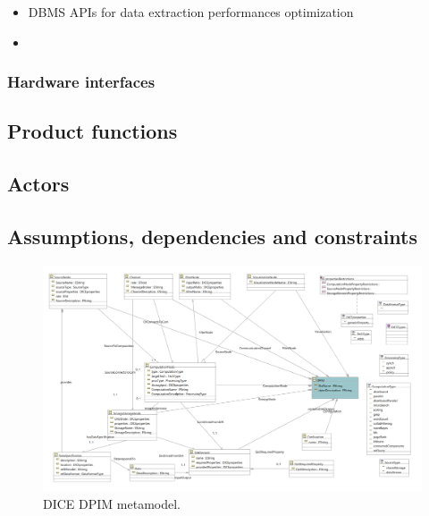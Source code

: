 \begin{itemize}
    \item DBMS APIs for data extraction performances optimization
    \item 
\end{itemize}

\subsubsection{Hardware interfaces}


\subsection{Product functions}
\label{sect:product_functions}

\subsection{Actors}

\subsection{Assumptions, dependencies and constraints}

\begin{figure}
\centering
\includegraphics[width=\textwidth]{Images/11.png}
\caption{\label{fig:metamodel}DICE DPIM metamodel.}
\end{figure}


